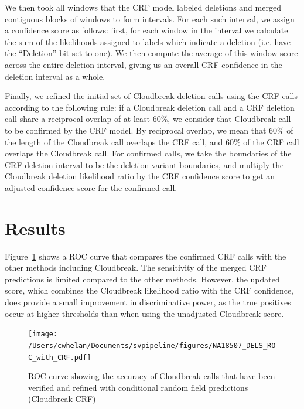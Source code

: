 We then took all windows that the CRF model labeled deletions and merged contiguous blocks of windows to form intervals. For each such interval, we assign a confidence score as follows: first, for each window in the interval we calculate the sum of the likelihoods assigned to labels which indicate a deletion (i.e. have the ``Deletion'' bit set to one). We then compute the average of this window score across the entire deletion interval, giving us an overall CRF confidence in the deletion interval as a whole.

Finally, we refined the initial set of Cloudbreak deletion calls using the CRF calls according to the following rule: if a Cloudbreak deletion call and a CRF deletion call share a reciprocal overlap of at least 60\%, we consider that Cloudbreak call to be confirmed by the CRF model. By reciprocal overlap, we mean that 60\% of the length of the Cloudbreak call overlaps the CRF call, and 60\% of the CRF call overlaps the Cloudbreak call. For confirmed calls, we take the boundaries of the CRF deletion interval to be the deletion variant boundaries, and multiply the Cloudbreak deletion likelihood ratio by the CRF confidence score to get an adjusted confidence score for the confirmed call.

\section{Results}

Figure~\ref{roc_NA18507_with_crf} shows a ROC curve that compares the confirmed CRF calls with the other methods including Cloudbreak. The sensitivity of the merged CRF predictions is limited compared to the other methods. However, the updated score, which combines the Cloudbreak likelihood ratio with the CRF confidence, does provide a small improvement in discriminative power, as the true positives occur at higher thresholds than when using the unadjusted Cloudbreak score.

\begin{figure}
\centering
\texttt{[image: /Users/cwhelan/Documents/svpipeline/figures/NA18507\_DELS\_ROC\_with\_CRF.pdf]}
\caption[ROC curve for CRF-confirmed Cloudbreak deletion calls.]{ROC curve showing the accuracy of Cloudbreak calls that have been verified and refined with conditional random field predictions (Cloudbreak-CRF)}
\label{roc_NA18507_with_crf}
\end{figure}


